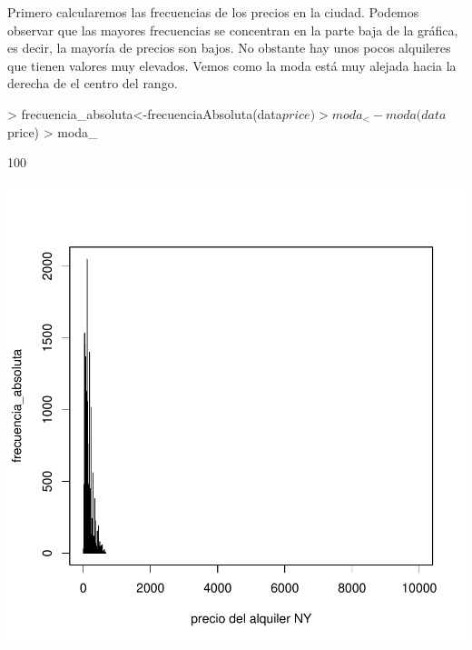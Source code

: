 \documentclass [a4paper] {article}
\begin{document}
Primero calcularemos las frecuencias de los precios en la ciudad.
Podemos observar que las mayores frecuencias se concentran en la parte baja de la gráfica, es decir, la mayoría de precios son bajos.
No obstante hay unos pocos alquileres que tienen valores muy elevados.
Vemos como la moda está muy alejada hacia la derecha de el centro del rango.
\begin{Schunk}
\begin{Sinput}
> frecuencia_absoluta<-frecuenciaAbsoluta(data$price)
> moda_ <- moda(data$price)
> moda_
\end{Sinput}
\begin{Soutput}
[1] 100
\end{Soutput}
\end{Schunk}
\begin{center}
\includegraphics{entrega-frecuencia_absoluta_BNB_plot}
\end{center}
\begin{Schunk}
\end{Schunk}
\end{document}
